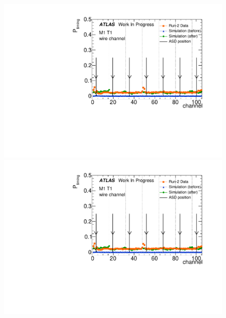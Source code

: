 \begin{figure}[htbp]
\begin{minipage}{0.49\hsize}
			\end{minipage}\\
			\begin{minipage}{0.49\hsize}
			\centering
			\includegraphics[width=\textwidth,page=17]{img/pdf5/master_timingplot_comp.pdf}
			\end{minipage}
			\begin{minipage}{0.49\hsize}
			\centering
			\includegraphics[width=\textwidth,page=19]{img/pdf5/master_timingplot_comp.pdf}
			\end{minipage}\\
			\begin{minipage}{0.49\hsize}
			\centering

\end{minipage}
\end{figure}
